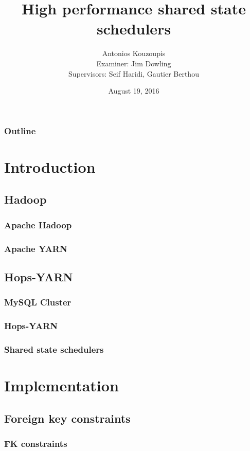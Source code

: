 \documentclass{beamer}
\title{High performance shared state schedulers}
\author[AK]{Antonios Kouzoupis\\[1em]{\footnotesize Examiner: Jim
    Dowling\\Supervisors: Seif Haridi, Gautier Berthou}}
\institute[KTH/SICS]{}
\date[date]{August 19, 2016}
\begin{document}
\section{}
\begin{frame}
\titlepage
\end{frame}

\section*{}
\begin{frame}
\frametitle{Outline}
\footnotesize
\tableofcontents
\normalsize
\end{frame}

\section{Introduction}
\subsection{Hadoop}
\begin{frame}
\frametitle{Apache Hadoop}
\end{frame}

\begin{frame}
\frametitle{Apache YARN}
\end{frame}

\subsection{Hops-YARN}
\begin{frame}
\frametitle{MySQL Cluster}
\end{frame}

\begin{frame}
\frametitle{Hops-YARN}
\end{frame}

\begin{frame}
\frametitle{Shared state schedulers}
\end{frame}

\section{Implementation}
\subsection{Foreign key constraints}
\begin{frame}
\frametitle{FK constraints}
\end{frame}
\end{document}
